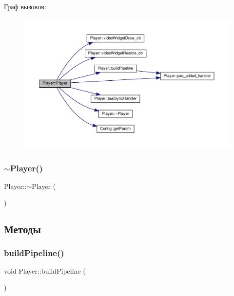 Граф вызовов\+:\nopagebreak
\begin{figure}[H]
\begin{center}
\leavevmode
\includegraphics[width=350pt]{class_player_a4b179b1c59f780f59e215fa5642acb99_cgraph}
\end{center}
\end{figure}
\mbox{\label{class_player_a749d2c00e1fe0f5c2746f7505a58c062}} 
\subsubsection{\texorpdfstring{$\sim$\+Player()}{~Player()}\hspace{0.1cm}{\footnotesize\ttfamily [2/2]}}
{\footnotesize\ttfamily Player\+::$\sim$\+Player (\begin{DoxyParamCaption}{ }\end{DoxyParamCaption})}



\subsection{Методы}
\mbox{\label{class_player_aca2616201a97a901612fd9df7a900ca1}} 
\subsubsection{\texorpdfstring{build\+Pipeline()}{buildPipeline()}\hspace{0.1cm}{\footnotesize\ttfamily [1/2]}}
{\footnotesize\ttfamily void Player\+::build\+Pipeline (\begin{DoxyParamCaption}{ }\end{DoxyParamCaption})\hspace{0.3cm}{\ttfamily [private]}}

